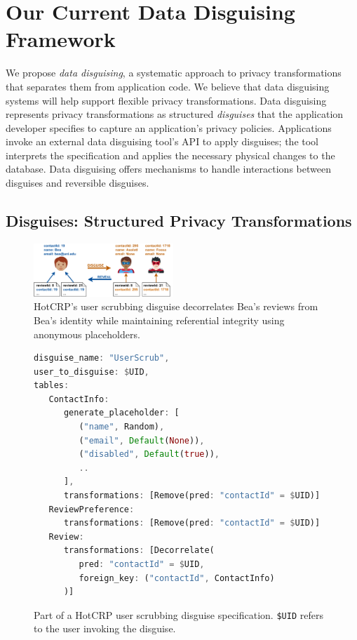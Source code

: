 \section{Our Current Data Disguising Framework}

We propose \emph{data disguising}, a systematic approach to privacy transformations
that separates them from application code.
%
We believe that data disguising systems will help support flexible privacy
transformations.
%
Data disguising represents privacy transformations as structured \emph{disguises}
that the application developer specifies to capture an application's privacy policies.
%
Applications invoke an external data disguising tool's API to apply disguises; the tool
interprets the specification and applies the necessary physical changes to the
database.
%
Data disguising offers mechanisms to handle interactions between disguises and
reversible disguises.

%
%

\subsection{Disguises: Structured Privacy Transformations}
\label{sec:disguises}

\begin{figure}[t]
    \centering
    \includegraphics[width=0.47\textwidth]{img/disguises_new}

    \caption{HotCRP's user scrubbing disguise decorrelates Bea's reviews from Bea's identity while maintaining
    referential integrity using anonymous placeholders.}
    \label{fig:example}
\end{figure}

\begin{figure}[t!]
    \centering
    \footnotesize
\begin{lstlisting}[language=Rust]
disguise_name: "UserScrub",
user_to_disguise: $UID,
tables:
   ContactInfo:
      generate_placeholder: [
         ("name", Random),
         ("email", Default(None)),
         ("disabled", Default(true)),
         ..
      ],
      transformations: [Remove(pred: "contactId" = $UID)]
   ReviewPreference:
      transformations: [Remove(pred: "contactId" = $UID)]
   Review:
      transformations: [Decorrelate(
         pred: "contactId" = $UID,
         foreign_key: ("contactId", ContactInfo)
      )]
\end{lstlisting}
    \caption{Part of a HotCRP user scrubbing disguise specification. \texttt{\$UID} refers
    to the user invoking the disguise.}
    \label{fig:spec}
\end{figure}

